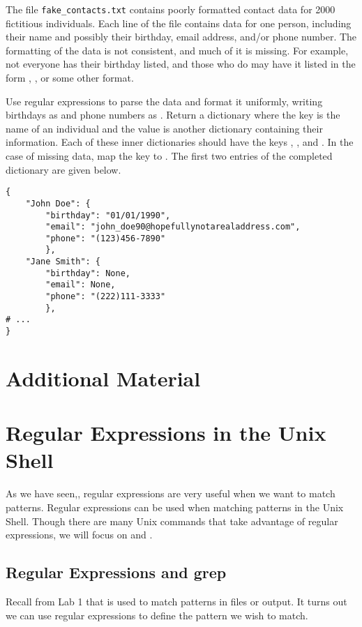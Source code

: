 \begin{problem}
The file \texttt{fake\_contacts.txt} contains poorly formatted contact data for 2000 fictitious individuals.
Each line of the file contains data for one person, including their name and possibly their birthday, email address, and/or phone number.
The formatting of the data is not consistent, and much of it is missing.
For example, not everyone has their birthday listed, and those who do may have it listed in the form , , or some other format.

Use regular expressions to parse the data and format it uniformly, writing birthdays as  and phone numbers as .
Return a dictionary where the key is the name of an individual and the value is another dictionary containing their information.
Each of these inner dictionaries should have the keys , , and .
In the case of missing data, map the key to .
The first two entries of the completed dictionary are given below.

\begin{lstlisting}
{
    "John Doe": {
        "birthday": "01/01/1990",
        "email": "john_doe90@hopefullynotarealaddress.com",
        "phone": "(123)456-7890"
        },
    "Jane Smith": {
        "birthday": None,
        "email": None,
        "phone": "(222)111-3333"
        },
# ...
}
\end{lstlisting}
\end{problem}

\newpage

\section*{Additional Material} %

\section*{Regular Expressions in the Unix Shell}
As we have seen,, regular expressions are very useful when we want to match patterns.
Regular expressions can be used when matching patterns in the Unix Shell.
Though there are many Unix commands that take advantage of regular expressions, we will focus on  and .

\subsection*{Regular Expressions and grep}
Recall from Lab 1 that  is used to match patterns in files or output.
It turns out we can use regular expressions to define the pattern we wish to match.

